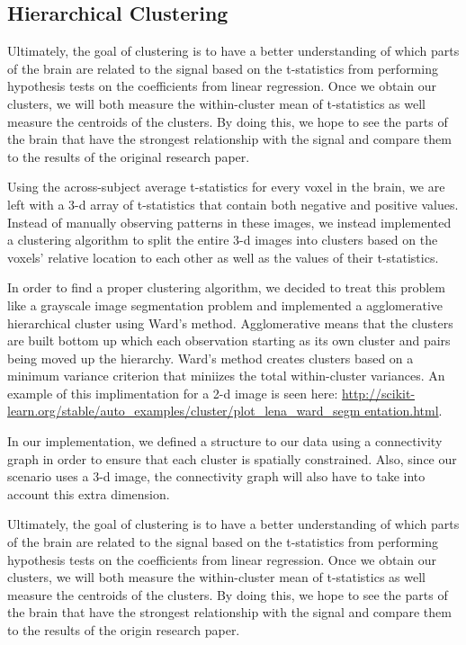 \subsection{Hierarchical Clustering}

\par Ultimately, the goal of clustering is to have a better understanding of 
which parts of the brain are related to the signal based on the t-statistics 
from performing hypothesis tests on the coefficients from linear regression.
Once we obtain our clusters, we will both measure the within-cluster mean of
t-statistics as well measure the centroids of the clusters. By doing this, we 
hope to see the parts of the brain that have the strongest relationship with 
the signal and compare them to the results of the original research paper.

Using the across-subject average t-statistics for every voxel in the
brain, we are left with a 3-d array of t-statistics that contain both negative
and positive values. Instead of manually observing patterns in these images, we
instead implemented a clustering algorithm to split the entire 3-d images into
clusters based on the voxels' relative location to each other as well as the
values of their t-statistics.

\par In order to find a proper clustering algorithm, we decided to treat this
problem like a grayscale image segmentation problem and implemented a
agglomerative hierarchical cluster using Ward's method. Agglomerative means
that the clusters are built bottom up which each observation starting as its
own cluster and pairs being moved up the hierarchy. Ward's method creates
clusters based on a minimum variance criterion that miniizes the total
within-cluster variances. An example of this implimentation for a 2-d image is
seen here:
\url{http://scikit-learn.org/stable/auto_examples/cluster/plot_lena_ward_segm
entation.html}.

In our implementation, we defined a structure to our data using a connectivity
graph in order to ensure that each cluster is spatially constrained. Also,
since our scenario uses a 3-d image, the connectivity graph will also have to
take into account this extra dimension.

\par Ultimately, the goal of clustering is to have a better understanding of
which parts of the brain are related to the signal based on the t-statistics
from performing hypothesis tests on the coefficients from linear regression.
Once we obtain our clusters, we will both measure the within-cluster mean of
t-statistics as well measure the centroids of the clusters. By doing this, we
hope to see the parts of the brain that have the strongest relationship with
the signal and compare them to the results of the origin research paper.

